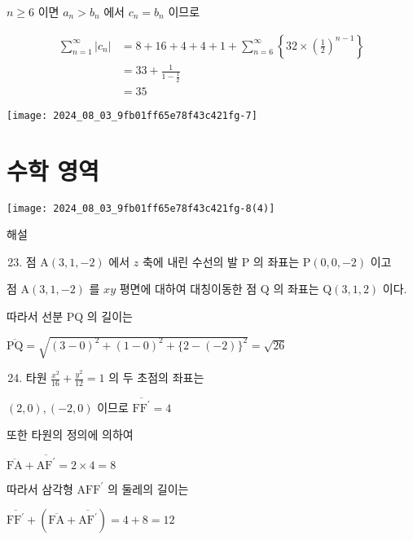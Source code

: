 \documentclass[10pt]{article}
\begin{document}
\(n \geq 6\) 이면 \(a_{n}>b_{n}\) 에서 \(c_{n}=b_{n}\) 이므로

\[
\begin{aligned}
\sum_{n=1}^{\infty}\left|c_{n}\right| & =8+16+4+4+1+\sum_{n=6}^{\infty}\left\{32 \times\left(\frac{1}{2}\right)^{n-1}\right\} \\
& =33+\frac{1}{1-\frac{1}{2}} \\
& =35
\end{aligned}
\]

\begin{center}
\texttt{[image: 2024\_08\_03\_9fb01ff65e78f43c421fg-7]}
\end{center}

\section*{수학 영역}
\begin{center}
\texttt{[image: 2024\_08\_03\_9fb01ff65e78f43c421fg-8(4)]}
\end{center}

해설

\begin{enumerate}
  \setcounter{enumi}{22}
  \item 점 \(\mathrm{A}(3,1,-2)\) 에서 \(z\) 축에 내린 수선의 발 P 의 좌표는 \(\mathrm{P}(0,0,-2)\) 이고
\end{enumerate}

점 \(\mathrm{A}(3,1,-2)\) 를 \(x y\) 평면에 대하여 대칭이동한 점 Q 의 좌표는 \(\mathrm{Q}(3,1,2)\) 이다.

따라서 선분 PQ 의 길이는

\(\overline{\mathrm{PQ}}=\sqrt{(3-0)^{2}+(1-0)^{2}+\{2-(-2)\}^{2}}=\sqrt{26}\)

\begin{enumerate}
  \setcounter{enumi}{23}
  \item 타원 \(\frac{x^{2}}{16}+\frac{y^{2}}{12}=1\) 의 두 초점의 좌표는
\end{enumerate}

\((2,0),(-2,0)\) 이므로 \(\overline{\mathrm{FF}^{\prime}}=4\)

또한 타원의 정의에 의하여

\(\overline{\mathrm{FA}}+\overline{\mathrm{AF}^{\prime}}=2 \times 4=8\)

따라서 삼각형 \(\mathrm{AFF}^{\prime}\) 의 둘레의 길이는

\(\overline{\mathrm{FF}^{\prime}}+\left(\overline{\mathrm{FA}}+\overline{\mathrm{AF}^{\prime}}\right)=4+8=12\)
\end{document}
